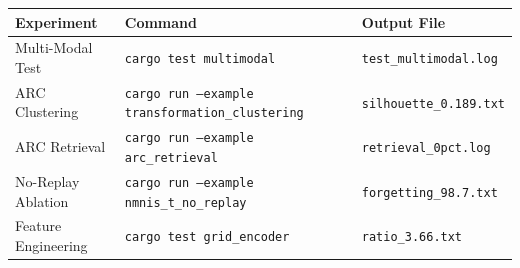 \documentclass[11pt,a4paper]{article}
\begin{document}
\begin{table}[h]
\centering
\begin{tabular}{@{}lll@{}}
\toprule
\textbf{Experiment} & \textbf{Command} & \textbf{Output File} \\
\midrule
Multi-Modal Test & \texttt{cargo test multimodal} & \texttt{test\_multimodal.log} \\
ARC Clustering & \texttt{cargo run --example transformation\_clustering} & \texttt{silhouette\_0.189.txt} \\
ARC Retrieval & \texttt{cargo run --example arc\_retrieval} & \texttt{retrieval\_0pct.log} \\
No-Replay Ablation & \texttt{cargo run --example nmnis\_t\_no\_replay} & \texttt{forgetting\_98.7.txt} \\
Feature Engineering & \texttt{cargo test grid\_encoder} & \texttt{ratio\_3.66.txt} \\
\bottomrule
\end{tabular}
\end{table}
\end{document}
